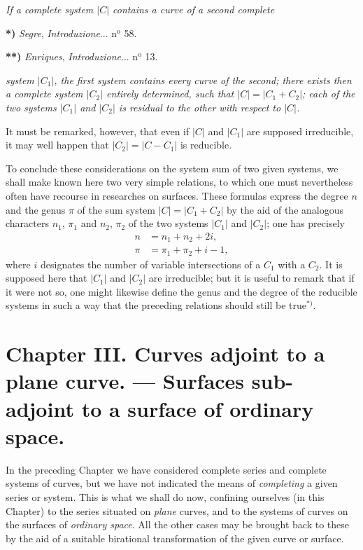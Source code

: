\documentclass{article}
\begin{document}
\emph{If a complete system $|C|$ contains a curve of a second complete}

\textbf{*)} \emph{Segre}, \emph{Introduzione}... n${}^{\text{o}}$ 58.

\textbf{**)} \emph{Enriques}, \emph{Introduzione}... n${}^{\text{o}}$ 13.

\emph{system $|C_{1}|$, the first system contains every curve of the second; there exists then a complete system $|C_{2}|$ entirely determined, such that $|C| = |C_{1} + C_{2}|$; each of the two systems $|C_{1}|$ and $|C_{2}|$ is residual to the other with respect to $|C|$.}

It must be remarked, however, that even if $|C|$ and $|C_{1}|$ are supposed irreducible, it may well happen that $|C_{2}| = |C - C_{1}|$ is reducible.

To conclude these considerations on the system sum of two given systems, we shall make known here two very simple relations, to which one must nevertheless often have recourse in researches on surfaces. These formulas express the degree $n$ and the genus $\pi$ of the sum system $|C| = |C_{1} + C_{2}|$ by the aid of the analogous characters $n_{1}$, $\pi_{1}$ and $n_{2}$, $\pi_{2}$ of the two systems $|C_{1}|$ and $|C_{2}|$; one has precisely
\[
\begin{aligned}
n &= n_{1} + n_{2} + 2i,\\
\pi &= \pi_{1} + \pi_{2} + i - 1,
\end{aligned}
\]
where $i$ designates the number of variable intersections of a $C_{1}$ with a $C_{2}$. It is supposed here that $|C_{1}|$ and $|C_{2}|$ are irreducible; but it is useful to remark that if it were not so, one might likewise define the genus and the degree of the reducible systems in such a way that the preceding relations should still be true${}^{*)}$.

\section*{Chapter III. Curves adjoint to a plane curve. --- Surfaces sub-adjoint to a surface of ordinary space.}

In the preceding Chapter we have considered complete series and complete systems of curves, but we have not indicated the means of \emph{completing} a given series or system. This is what we shall do now, confining ourselves (in this Chapter) to the series situated on \emph{plane} curves, and to the systems of curves on the surfaces of \emph{ordinary space}. All the other cases may be brought back to these by the aid of a suitable birational transformation of the given curve or surface.
\end{document}
